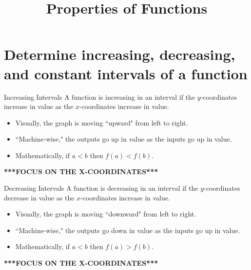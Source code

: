 \documentclass[t,usenames,dvipsnames]{beamer}
\title{Properties of Functions}
\author{}
\date{}
\begin{document}
\begin{frame}
    \titlepage
\end{frame}


\section{Determine increasing, decreasing, and constant intervals of a function}

\begin{frame}{Increasing Intervals}
A function is \alert{increasing} in an interval if the $y$-coordinates increase in value as the $x$-coordinates increase in value.    \newline\\   \pause

\begin{itemize}
    \item Visually, the graph is moving ``upward" from left to right.   \newline\\  \pause
    \item ``Machine-wise," the outputs go up in value as the inputs go up in value. \newline\\  \pause
    \item Mathematically, if $a < b$ then $f(a) < f(b)$.    \newline\\  \pause
\end{itemize}

\begin{center}
    {\color{red}\textbf{***FOCUS ON THE X-COORDINATES***}}
\end{center}
\end{frame}

\begin{frame}{Decreasing Intervals}
A function is \alert{decreasing} in an interval if the $y$-coordinates decrease in value as the $x$-coordinates increase in value.  \newline\\  \pause

\begin{itemize}
    \item Visually, the graph is moving ``downward" from left to right.   \newline\\  \pause
    \item ``Machine-wise," the outputs go down in value as the inputs go up in value. \newline\\  \pause
    \item Mathematically, if $a < b$ then $f(a) > f(b)$.    \newline\\  \pause
\end{itemize}

\begin{center}
    {\color{red}\textbf{***FOCUS ON THE X-COORDINATES***}}
\end{center}
\end{frame}
\end{document}
